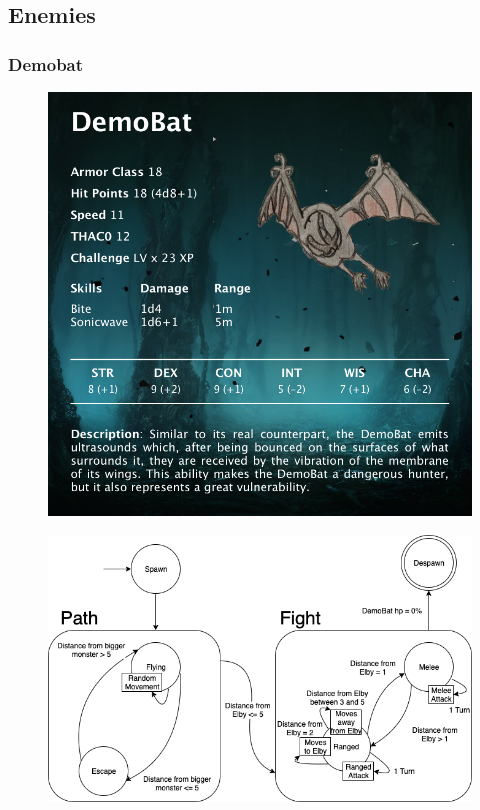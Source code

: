 \subsection{Enemies}

\subsubsection{Demobat}
\vspace*{0.3cm}
\begin{figure}[H]
	\centering
	\includegraphics[width=0.9\linewidth]{images/visual_stats/demobat.png}
\end{figure}
\newpage
\begin{figure}[H]
	\centering
	\includegraphics[width=0.8\linewidth]{images/graphs/fsa/fsa_demobat.png}
\end{figure}
